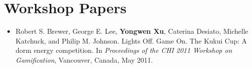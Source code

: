 \section{Workshop Papers}

\begin{itemize}

\item Robert S. Brewer, George E. Lee, \textbf{Yongwen Xu}, Caterina Desiato, Michelle Katchuck, and Philip M. Johnson. Lights Off. Game On. The Kukui Cup: A dorm energy competition. In \emph{Proceedings of the CHI 2011 Workshop on Gamification}, Vancouver, Canada, May 2011.

\end{itemize}
